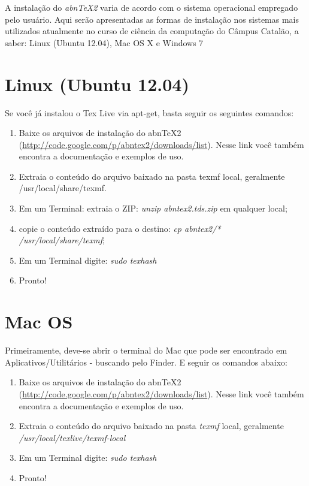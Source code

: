 
A instalação do \emph{abnTeX2} varia de acordo com o sistema operacional empregado pelo usuário. Aqui serão apresentadas as formas de instalação nos sistemas mais utilizados atualmente no curso de ciência da computação do Câmpus Catalão, a saber: Linux (Ubuntu 12.04), Mac OS X e Windows 7

\section{Linux (Ubuntu 12.04)}

Se você já instalou o Tex Live via apt-get, basta seguir os seguintes comandos:

\begin{enumerate}

\item Baixe os arquivos de instalação do abnTeX2 (\url{http://code.google.com/p/abntex2/downloads/list}). Nesse link você também encontra a documentação e exemplos de uso.
\item Extraia o conteúdo do arquivo baixado na pasta texmf local, geralmente /usr/local/share/texmf. 
\item Em um Terminal: extraia o ZIP: \emph{unzip abntex2.tds.zip} em qualquer local;
\item copie o conteúdo extraído para o destino: \emph{cp abntex2/* /usr/local/share/texmf};
\item Em um Terminal digite: \emph{sudo texhash}
\item Pronto!
\end{enumerate}

\section{Mac OS}

Primeiramente, deve-se abrir o terminal do Mac que pode ser encontrado em Aplicativos/Utilitários - buscando pelo Finder.  E seguir os comandos abaixo:
\begin{enumerate}
\item Baixe os arquivos de instalação do abnTeX2 (\url{http://code.google.com/p/abntex2/downloads/list}). Nesse link você também encontra a documentação e exemplos de uso.
\item Extraia o conteúdo do arquivo baixado na pasta \emph{texmf} local, geralmente \emph{/usr/local/texlive/texmf-local}
\item Em um Terminal digite: \emph{sudo texhash}
\item Pronto!
\end{enumerate}
 
